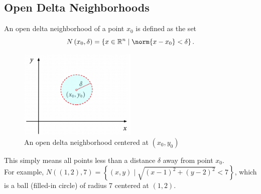 \subsection{Open Delta Neighborhoods}
\noindent
An open delta neighborhood of a point $x_0$ is defined as the set
\begin{equation*}
	N\left(x_0, \delta\right) = \left\{x \in \mathbb{R}^n \mid \norm{x-x_0} < \delta\right\}.
\end{equation*}

\begin{figure}[H]
	\centering
	\includegraphics[width=0.5\textwidth]{./differentialMultivariableCalculus/open_delta.png}
	\caption{An open delta neighborhood centered at $(x_0, y_0)$}
\end{figure}

\noindent
This simply means all points less than a distance $\delta$ away from point $x_0$.\\
For example, $N( (1,2) , 7) = \left\{ (x,y) \mid \sqrt{(x-1)^2 + (y-2)^2}<7 \right\}$, which is a ball (filled-in circle) of radius 7 centered at $(1, 2)$.